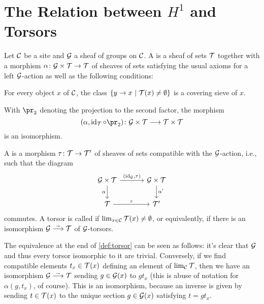 \section{The Relation between \texorpdfstring{$H^1$}{H1} and Torsors}\label{sec:torsors}
\begin{defi}\label{def:torsor}
	Let $\mathcal{C}$ be a site and $\mathcal{G}$ a sheaf of groups on $\mathcal{C}$. A  is a sheaf of sets $\mathcal{T}$ together with a morphism $\alpha\colon \Gg\times \Tt\morphism \Tt$ of sheaves of sets satisfying the usual axioms for a left $\mathcal{G}$-action as well as the following conditions:
	\begin{alphanumerate}
		\item For every object $x$ of $\mathcal{C}$, the class $\left\{y\morphism x\st \Tt(x)\neq \emptyset\right\}$ is a covering sieve of $x$.
		\item With $\pr_2$ denoting the projection to the second factor, the morphism
		\begin{equation*}
			(\alpha,\id_\Tt\circ \pr_2)\colon \Gg\times \Tt\morphism \Tt\times\Tt
		\end{equation*}
		is an isomorphism.
	\end{alphanumerate}
	A  is a morphism $\tau\colon \Tt\morphism \Tt'$ of sheaves of sets compatible with the $\mathcal{G}$-action, i.e., such that the diagram
	\begin{equation*}
		\begin{tikzcd}
			\Gg\times \Tt\dar["\alpha"'] \rar["{(\id_\Gg,\tau)}"] &[1em] \Gg\times \Tt\dar["\smash{\alpha'}\vphantom{\alpha}"]\\
			\Tt\rar["\tau"] &[1em] \Tt'
		\end{tikzcd}
	\end{equation*}
	commutes. A torsor is called  if $\operatorname*{lim}_{x\in \mathcal{C}}\mathcal{T}(x)\neq \emptyset$, or equivalently, if there is an isomorphism $\Gg\isomorphism \Tt$ of $\mathcal{G}$-torsors.
\end{defi}
\begin{rem}
	The equivalence at the end of \cref{def:torsor} can be seen as follows: it's clear that $\mathcal{G}$ and thus every torsor isomorphic to it are trivial. Conversely, if we find compatible elements $t_x\in \mathcal{T}(x)$ defining an element of $\operatorname*{lim}_{\mathcal{C}}\mathcal{T}$, then we have an isomorphism $\Gg\isomorphism \Tt$ sending $g\in \mathcal{G}(x)$ to $gt_x$ (this is abuse of notation for $\alpha(g,t_x)$, of course). This is an isomorphism, because an inverse is given by sending $t\in \mathcal{T}(x)$ to the unique section $g\in \mathcal{G}(x)$ satisfying $t=gt_x$.
\end{rem}
